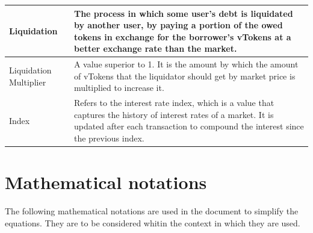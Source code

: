 \begin{tabularx}{\linewidth}{|l|X|}
  Liquidation & The process in which some user's debt is liquidated by another user, by paying a portion of the owed tokens in exchange for the borrower's vTokens at a better exchange rate than the market. \\\hline
  
  Liquidation Multiplier & A value superior to 1. It is the amount by which the amount of vTokens that the liquidator should get by market price is multiplied to increase it. \\\hline

  Index & Refers to the interest rate index, which is a value that captures the history of interest rates of a market. It is updated after each transaction to compound the interest since the previous index. \\\hline
\end{tabularx}

\newpage
\section{Mathematical notations}
\label{spec:mn}
The following mathematical notations are used in the document to simplify the equations. They are to be considered whitin the context in which they are used.

\newcommand\USD{\mathit{USD}}

\newcommand\M[1]{\mathit{m_{#1}}}
\newcommand\T[1]{\mathit{T_{#1}}}

\newcommand\ER[2]{\mathit{ER(#1, #2)}}

\newcommand\BA[1]{\mathit{Ba(#1)}}
\newcommand\C[1]{\mathit{C(#1)}}

\newcommand\UR[1]{\mathit{UR_{#1}}}
\newcommand\UM[1]{\mathit{UM_{#1}}}
\newcommand\UBR[1]{\mathit{UbR_{#1}}}
\newcommand\BIR[1]{\mathit{BIR_{#1}}}
\newcommand\RF[1]{\mathit{RF_{#1}}}

\newcommand\RTB[1]{\mathit{rTB(#1)}}
\newcommand\VTB[1]{\mathit{vTB_{#1}}}
\newcommand\RES[1]{\mathit{Res_{#1}}}

\newcommand\CF[1]{\mathit{CF(#1)}}
\newcommand\AH[1]{\mathit{AH_{#1}}}
\newcommand\BC[1]{\mathit{BC_{#1}}}

\newcommand\IND[2]{\mathit{Ind_{#1, #2}}}
\newcommand\INDL[1]{\mathit{Indl_{#1}}}
\newcommand\AI[1]{\mathit{AI_{#1}}}

